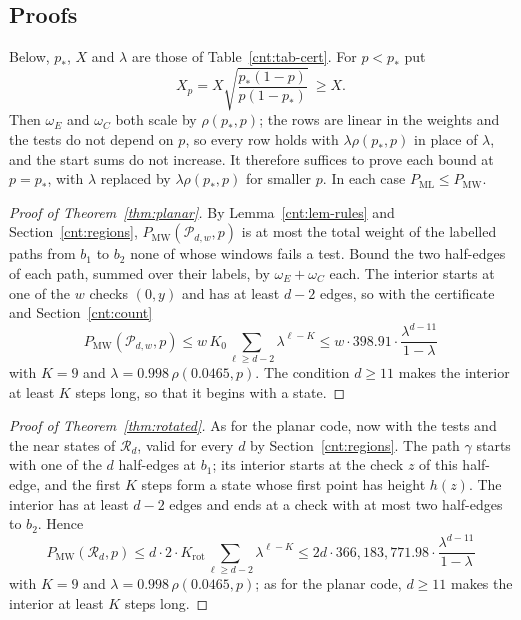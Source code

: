\documentclass[11pt]{amsart}
\theoremstyle{definition}
\theoremstyle{remark}
\numberwithin{equation}{section}
\newcommand{\PML}{P_{\mathrm{ML}}}
\newcommand{\PMW}{P_{\mathrm{MW}}}
\begin{document}
\subsection{Proofs}\label{cnt:proofs}
Below, $p_\ast$, $X$ and $\lambda$ are those of Table~\ref{cnt:tab-cert}. For $p<p_\ast$ put
\[
  X_p=X\sqrt{\frac{p_\ast(1-p)}{p(1-p_\ast)}}\ \ge X .
\]
Then $\omega_E$ and $\omega_C$ both scale by $\rho(p_\ast,p)$; the rows are linear in the weights and the tests do not
depend on $p$, so every row holds with $\lambda\rho(p_\ast,p)$ in place of $\lambda$, and the start sums do not
increase. It therefore suffices to prove each bound at $p=p_\ast$, with $\lambda$ replaced by $\lambda\rho(p_\ast,p)$ for
smaller $p$. In each case $\PML\le\PMW$.

\begin{proof}[Proof of Theorem~\ref{thm:planar}]
By Lemma~\ref{cnt:lem-rules} and Section~\ref{cnt:regions}, $\PMW(\mathcal P_{d,w},p)$ is at most the total weight of the
labelled paths from $b_1$ to $b_2$ none of whose windows fails a test. Bound the two half-edges of each path, summed
over their labels, by $\omega_E+\omega_C$ each. The interior starts at one of the $w$ checks $(0,y)$ and has at least
$d-2$ edges, so with the certificate and Section~\ref{cnt:count}
\[
  \PMW(\mathcal P_{d,w},p)\le w\,K_0\sum_{\ell\ge d-2}\lambda^{\ell-K}\le w\cdot398.91\cdot\frac{\lambda^{d-11}}{1-\lambda}
\]
with $K=9$ and $\lambda=0.998\,\rho(0.0465,p)$. The condition $d\ge11$ makes the interior at least $K$ steps long, so that
it begins with a state.
\end{proof}

\begin{proof}[Proof of Theorem~\ref{thm:rotated}]
As for the planar code, now with the tests and the near states of $\mathcal R_d$, valid for every $d$ by
Section~\ref{cnt:regions}. The path $\gamma$ starts with one of the $d$ half-edges at $b_1$; its interior starts at the
check $z$ of this half-edge, and the first $K$ steps form a state whose first point has height $h(z)$. The interior has
at least $d-2$ edges and ends at a check with at most two half-edges to $b_2$. Hence
\[
  \PMW(\mathcal R_d,p)\le d\cdot2\cdot K_{\mathrm{rot}}\sum_{\ell\ge d-2}\lambda^{\ell-K}\le 2d\cdot366{,}183{,}771.98\cdot\frac{\lambda^{d-11}}{1-\lambda}
\]
with $K=9$ and $\lambda=0.998\,\rho(0.0465,p)$; as for the planar code, $d\ge11$ makes the interior at least $K$ steps long.
\end{proof}
\end{document}
